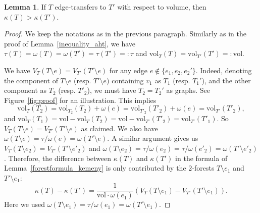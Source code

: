 \documentclass[11pt]{article}
\theoremstyle{definition}
\newtheorem{lemma}[theorem]{Lemma}
\newcommand{\vol}{\text{vol}}
\begin{document}
\begin{lemma}\label{inequality_kemeny}
If $T$ edge-transfers to $T'$ with respect to volume, then $\kappa(T)>\kappa(T')$.
\end{lemma}
\begin{proof}
We keep the notations as in the previous paragraph. Similarly as in the proof of Lemma~\ref{inequality_aht}, we have $\tau(T)=\omega(T)=\omega(T')=\tau(T')=:\tau$ and $\vol_T(T)=\vol_{T'}(T')=:\vol$.

We have $V_T(T\setminus e)=V_{T'}(T'\setminus e)$ for any edge $e\not\in \{e_1,e_2,e_2'\}$. Indeed, denoting the component of $T\setminus e$ (resp. $T'\setminus e$) containing $v_1$ as $T_1$ (resp. $T_1'$), and the other component as $T_2$ (resp. $T'_2$), we must have $T_2=T_2'$ as graphs. See Figure~\ref{fig:proof} for an illustration. This implies
    \[\vol_{T}(T_2)=\vol_{T_2}(T_2)+\omega(e)=\vol_{T'_2}(T'_2)+\omega(e)=\vol_{T'}(T'_2),\]
and $\vol_{T}(T_1)=\vol -\vol_{T}(T_2)=\vol -\vol_{T'}(T'_2)=\vol_{T'}(T'_1)$. So $V_T(T\setminus e)=V_{T'}(T'\setminus e)$ as claimed. We also have $\omega(T\setminus e)=\tau/\omega(e)=\omega(T'\setminus e)$. A similar argument gives us $V_T(T\setminus e_2)=V_{T'}(T'\setminus e'_2)$ and $\omega(T\setminus e_2)=\tau/\omega(e_2)=\tau/\omega(e'_2)=\omega(T'\setminus e'_2)$. Therefore, the difference between $\kappa(T)$ and $\kappa(T')$ in the formula of Lemma~\ref{forestformula_kemeny} is only contributed by the $2$-forests $T\setminus e_1$ and $T'\setminus e_1$:\begin{equation}\label{eq:inequality_kemeny_1}
    \kappa(T)-\kappa(T')=\frac{1}{\vol \cdot \omega(e_1)}(V_T(T\setminus e_1)-V_{T'}(T'\setminus e_1)).
\end{equation} Here we used $\omega(T\setminus e_1)=\tau/\omega(e_1)=\omega(T'\setminus e_1)$.


\end{proof}
\end{document}
